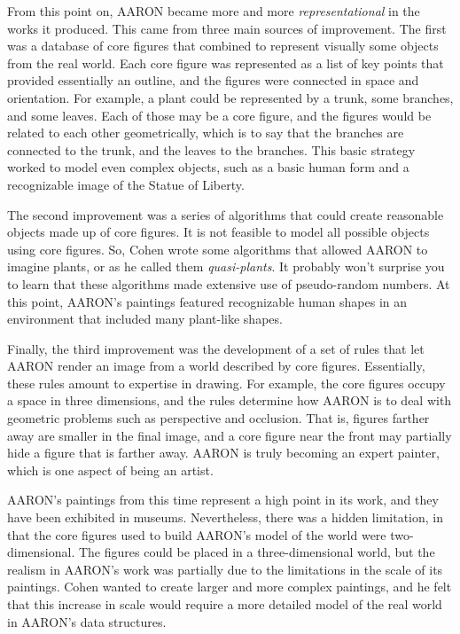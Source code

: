 From this point on, AARON became more and more \emph{representational} in
the works it produced. This came from three main sources of improvement. The first
was a database of core figures that combined to represent visually some
objects from the real world. Each core figure was represented as a list of
key points that provided essentially an outline, and the figures were connected
in space and orientation.
For example, a plant could be represented by
a trunk, some branches, and some leaves. Each of those may be a core figure,
and the figures would be related to each other geometrically, which is to say
that the branches are connected to the trunk, and the leaves to the branches.
This basic strategy worked to model even complex objects, such as a basic human
form and a recognizable image of the Statue of Liberty.

The second improvement was a series of algorithms that could create reasonable
objects made up of core figures. It is not feasible to model all possible
objects using core figures. So, Cohen wrote some algorithms that allowed AARON to
imagine plants,
or as he called them \emph{quasi-plants}. It probably won't surprise
you to learn that these algorithms made extensive use of pseudo-random numbers.
At this point, AARON's paintings featured recognizable human shapes
in an environment that included many plant-like shapes.

Finally, the third improvement was the development of a set of rules that
let AARON render an image from a world described by core figures. Essentially,
these rules amount to expertise in drawing. For example, the core figures occupy
a space in three dimensions, and the rules determine how AARON is to deal with
geometric problems such as perspective and occlusion. That is, figures farther
away are smaller in the final image, and a core figure near the front may
partially hide a figure that is farther away. AARON is truly becoming an expert
painter, which is one aspect of being an artist.

AARON's paintings from this time represent a high point in its work, and they
have been exhibited in museums.
Nevertheless, there was a hidden limitation, in that the core figures
used to build AARON's model of the world were two-dimensional. The figures could be
placed in a three-dimensional world, but the realism in AARON's work was partially
due to the limitations in the scale of its paintings. Cohen wanted to create larger
and more complex paintings, and he felt that this increase in scale would require a
more detailed model of the real world in AARON's data structures.

